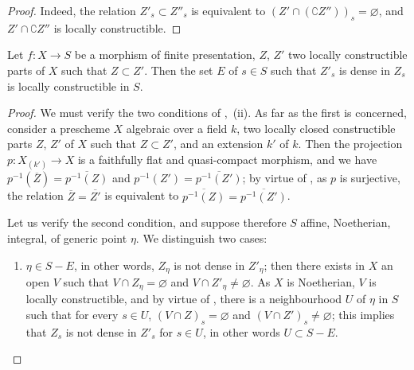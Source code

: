 \begin{proof}
Indeed, the relation $Z'_s\subset Z''_s$ is equivalent to $(Z'\cap(\complement Z''))_s=\varnothing$, and $Z'\cap\complement Z''$ is locally constructible.
\end{proof}

\begin{proposition}[9.5.3]
\label{IV.9.5.3}
Let $f:X\to S$ be a morphism of finite presentation, $Z$, $Z'$ two locally constructible parts of $X$ such that $Z\subset Z'$.
Then the set $E$ of $s\in S$ such that $Z'_s$ is dense in $Z_s$ is locally constructible in $S$.
\end{proposition}

\begin{proof}
We must verify the two conditions of ,~(ii).
As far as the first is concerned, consider a prescheme $X$ algebraic over a field $k$, two locally closed constructible parts $Z$, $Z'$ of $X$ such that $Z\subset Z'$, and an extension $k'$ of $k$.
Then the projection $p:X_{(k')}\to X$ is a faithfully flat and quasi-compact morphism, and we have $p^{-1}(\overline{Z})=\overline{p^{-1}(Z)}$ and $p^{-1}(Z')=\overline{p^{-1}(Z')}$; by virtue of , as $p$ is surjective, the relation $\overline{Z}=\overline{Z'}$ is equivalent to $\overline{p^{-1}(Z)}=\overline{p^{-1}(Z')}$.

Let us verify the second condition, and suppose therefore $S$ affine, Noetherian, integral, of generic point $\eta$.
We distinguish two cases:
\begin{enumerate}[label=\upshape{$\arabic{enumi}^\circ$}]
  \item $\eta\in S-E$, in other words, $Z_\eta$ is not dense in $Z'_\eta$; then there exists in $X$ an open $V$ such that $V\cap Z_\eta=\varnothing$ and $V\cap Z'_\eta\neq\varnothing$.
  As $X$ is Noetherian, $V$ is locally constructible, and by virtue of , there is a neighbourhood $U$ of $\eta$ in $S$ such that for every $s\in U$, $(V\cap Z)_s=\varnothing$ and $(V\cap Z')_s\neq\varnothing$; this implies that $Z_s$ is not dense in $Z'_s$ for $s\in U$, in other words $U\subset S-E$.


\end{enumerate}
\end{proof}
